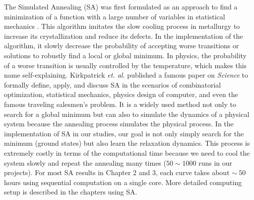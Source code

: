 The Simulated Annealing (SA) \cite{SA} was first formulated as an approach to find a minimization of a function with a large number of variables in statistical mechanics \cite{khachaturyan1979statistical, khachaturyan1981thermodynamic}. This algorithm imitates the slow cooling process in metallurgy to increase its crystallization and reduce its defects. In the implementation of the algorithm, it slowly decrease the probability of accepting worse transitions or solutions to robustly find a local or global minimum. In physics, the probability of a worse transition is usually controlled by the temperature, which makes this name self-explaining. Kirkpatrick {\it et. al.} \cite{SA} published a famous paper on {\it Science} to formally define, apply, and discuss SA  in the scenarios of combinatorial optimization, statistical mechanics, physics design of computer, and even the famous traveling salesmen's problem. It is a widely used method not only to search for a global minimum but can also to simulate the dynamics of a physical system because the annealing process simulates the physical process.
In the implementation of SA in our studies, our goal is not only simply search for the minimum (ground states) but also learn the relaxation dynamics. This process is extremely costly in terms of the computational time because we need to cool the system slowly and repeat the annealing many times ($50\sim 1000$ runs in our projects). For most SA results in Chapter 2 and 3, each curve takes about $\sim ~50$ hours using sequential computation on a single core. More detailed computing setup is described in the chapters using SA.


